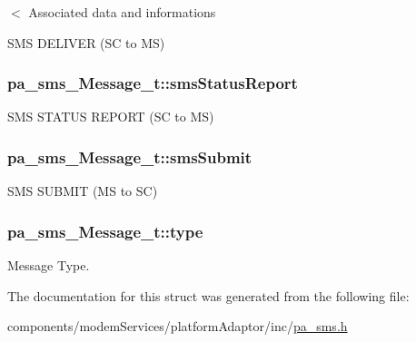 $<$ Associated data and informations 

S\+MS D\+E\+L\+I\+V\+ER (SC to MS) 
\subsubsection[{\texorpdfstring{sms\+Status\+Report}{smsStatusReport}}]{ pa\+\_\+sms\+\_\+\+Message\+\_\+t\+::sms\+Status\+Report}\hypertarget{structpa__sms___message__t_a7276a47a147f6eb593cc82e04cc3eb0c}{}\label{structpa__sms___message__t_a7276a47a147f6eb593cc82e04cc3eb0c}


S\+MS S\+T\+A\+T\+US R\+E\+P\+O\+RT (SC to MS) 

\subsubsection[{\texorpdfstring{sms\+Submit}{smsSubmit}}]{ pa\+\_\+sms\+\_\+\+Message\+\_\+t\+::sms\+Submit}\hypertarget{structpa__sms___message__t_a9455a4ebbdd927391183df5f74822e65}{}\label{structpa__sms___message__t_a9455a4ebbdd927391183df5f74822e65}


S\+MS S\+U\+B\+M\+IT (MS to SC) 

\subsubsection[{\texorpdfstring{type}{type}}]{ pa\+\_\+sms\+\_\+\+Message\+\_\+t\+::type}\hypertarget{structpa__sms___message__t_a33f4502e2b2b5a872da6bd4e0f17c1dd}{}\label{structpa__sms___message__t_a33f4502e2b2b5a872da6bd4e0f17c1dd}


Message Type. 



The documentation for this struct was generated from the following file\+:\begin{DoxyCompactItemize}
\item 
components/modem\+Services/platform\+Adaptor/inc/\hyperlink{pa__sms_8h}{pa\+\_\+sms.\+h}\end{DoxyCompactItemize}
